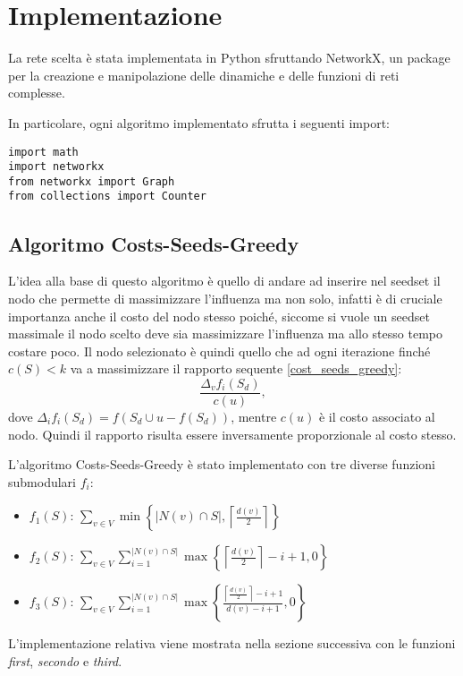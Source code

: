 \section{Implementazione}
La rete scelta è stata implementata in Python sfruttando NetworkX, un package per la creazione e manipolazione delle dinamiche e delle funzioni di reti complesse.

In particolare, ogni algoritmo implementato sfrutta i seguenti import:

\begin{code}
\begin{verbatim}
import math
import networkx
from networkx import Graph
from collections import Counter
\end{verbatim}
\end{code}

\subsection{Algoritmo Costs-Seeds-Greedy}

L'idea alla base di questo algoritmo è quello di andare ad inserire nel seedset il nodo che permette di massimizzare l'influenza ma non solo, infatti è di cruciale importanza anche il costo del nodo stesso poiché, siccome si vuole un seedset massimale il nodo scelto deve sia massimizzare l'influenza ma allo stesso tempo costare poco.
Il nodo selezionato è quindi quello che ad ogni iterazione finché $c(S) < k$ va a massimizzare il rapporto sequente \ref{cost_seeds_greedy}: 
\begin{equation}
\frac{\Delta_v f_i\left(S_d\right)}{c(u)},
\label{cost_seeds_greedy}
\end{equation}
dove $\Delta_if_i(S_d) = f(S_d \cup {u} - f(S_d))$, mentre $c(u)$ è il costo associato al nodo. Quindi il rapporto risulta essere inversamente proporzionale al costo stesso.

L'algoritmo Costs-Seeds-Greedy è stato implementato con tre diverse funzioni submodulari $f_i$:
\begin{itemize}
    \item \textbf{$f_1(S)$}: $\sum_{v \in V} \min \left\{|N(v) \cap S|,\left\lceil\frac{d(v)}{2}\right\rceil\right\}$
    \item \textbf{$f_2(S)$}: $\sum_{v \in V} \sum_{i=1}^{|N(v) \cap S|} \max \left\{\left\lceil\frac{d(v)}{2}\right\rceil-i+1,0\right\}$
    \item \textbf{$f_3(S)$}: $\sum_{v \in V} \sum_{i=1}^{|N(v) \cap S|} \max \left\{\frac{\left\lceil\frac{d(v)}{2}\right\rceil-i+1}{d(v)-i+1}, 0\right\}$
\end{itemize}
L'implementazione relativa viene mostrata nella sezione successiva con le funzioni \textit{first}, \textit{secondo} e \textit{third}.

